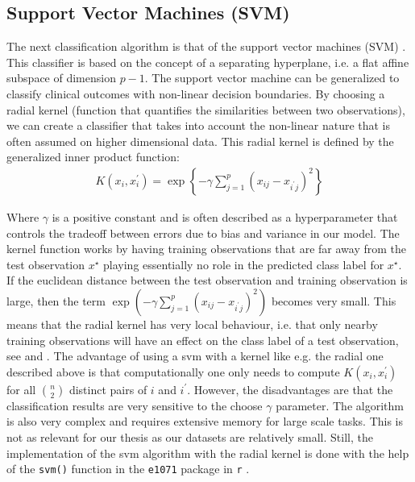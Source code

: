 \documentclass[../thesis.tex]{subfiles}
\begin{document}
\subsection{Support Vector Machines (SVM)}
\label{subsec:svm}

\noindent The next classification algorithm is that of the support vector machines (SVM) \citep{vapnik1963pattern}. This classifier is based on the concept of a separating hyperplane, i.e. a flat affine subspace of dimension $p-1$. The support vector machine can be generalized to classify clinical outcomes with non-linear decision boundaries. By choosing a radial kernel (function that quantifies the similarities between two observations), we can create a classifier that takes into account the non-linear nature that is often assumed on higher dimensional data. This radial kernel is defined by the generalized inner product function: 
\begin{align}
    K(x_i, x_i^\prime) = \exp{\left\{-\gamma \sum_{j=1}^p\left(x_{ij} - x_{i^\prime j} \right)^2\right\}}
\end{align}

\noindent Where $\gamma$ is a positive constant and is often described as a hyperparameter that controls the tradeoff between errors due to bias and variance in our model. The kernel function works by having training observations that are far away from the test observation $x^\star$ playing essentially no role in the predicted class label for $x^\star$. If the euclidean distance between the test observation and training observation is large, then the term $\exp{(-\gamma \sum_{j=1}^p\left(x_{ij} - x_{i^\prime j} \right)^2)}$ becomes very small. This means that the radial kernel has very local behaviour, i.e. that only nearby training observations will have an effect on the class label of a test observation, see \citep{friedman2009elements} and \citep{james2013introduction}. The advantage of using a svm with a kernel like e.g. the radial one described above is that computationally one only needs to compute $K(x_i, x_i^\prime)$ for all $\binom{n}{2}$ distinct pairs of $i$ and $i^\prime$. However, the disadvantages are that the classification results are very sensitive to the choose $\gamma$ parameter. The algorithm is also very complex and requires extensive memory for large scale tasks. This is not as relevant for our thesis as our datasets are relatively small. Still, the implementation of the svm algorithm with the radial kernel is done with the help of the \texttt{svm()} function in the \texttt{e1071} package in \texttt{r} \citep{svm}.
\end{document}
